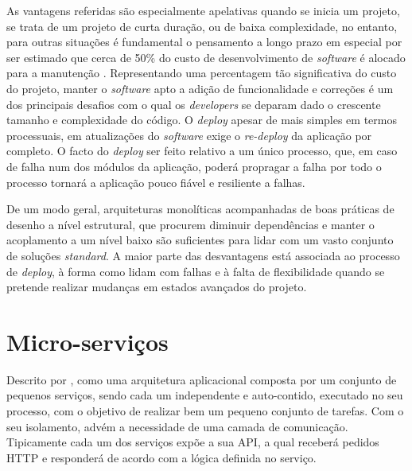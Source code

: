     As vantagens referidas são especialmente apelativas quando se inicia um projeto, se trata de um projeto de curta duração, ou de baixa complexidade, no entanto, para outras situações é fundamental o pensamento a longo prazo em especial por ser estimado que cerca de 50\% do custo de desenvolvimento de \textit{software} é alocado para a manutenção \citep{software_maintenance_cost_alija_17}. Representando uma percentagem tão significativa do custo do projeto, manter o \textit{software} apto a adição de funcionalidade e correções é um dos principais desafios com o qual os \textit{developers} se deparam dado o crescente tamanho e complexidade do código. O \textit{deploy} apesar de mais simples em termos processuais, em atualizações do \textit{software} exige o \textit{re-deploy} da aplicação por completo. O facto do \textit{deploy} ser feito relativo a um único processo, que, em caso de falha num dos módulos da aplicação, poderá propragar a falha por todo o processo tornará a aplicação pouco fiável e resiliente a falhas.
    
    De um modo geral, arquiteturas monolíticas acompanhadas de boas práticas de desenho a nível estrutural, que procurem diminuir dependências e manter o acoplamento a um nível baixo são suficientes para lidar com um vasto conjunto de soluções \textit{standard}. A maior parte das desvantagens está associada ao processo de \textit{deploy}, à forma como lidam com falhas e à falta de flexibilidade quando se pretende realizar mudanças em estados avançados do projeto. 
    
    
    

\section{Micro-serviços}


    Descrito por \cite{fowler14_definition_microservices}, como uma arquitetura aplicacional composta por um conjunto de pequenos serviços, sendo cada um independente e auto-contido, executado no seu processo, com o objetivo de realizar bem um pequeno conjunto de tarefas. Com o seu isolamento, advém a necessidade de uma camada de comunicação. Tipicamente cada um dos serviços expõe a sua API, a qual receberá pedidos HTTP e responderá de acordo com a lógica definida no serviço.
    
